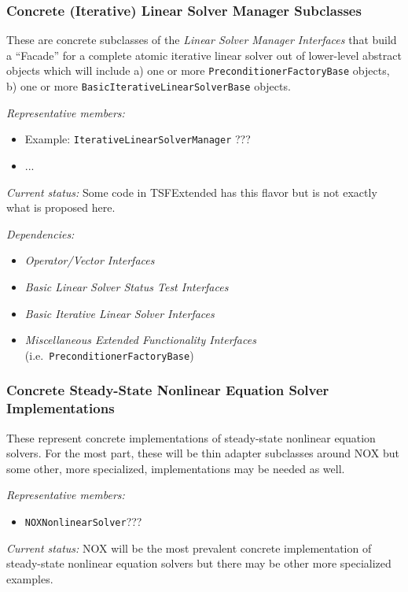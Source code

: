 \documentclass[pdf,ps2pdf,11pt]{SANDreport}
\begin{document}
%
\subsubsection{Concrete (Iterative) Linear Solver Manager Subclasses}
%

These are concrete subclasses of the {}\textit{Linear Solver Manager
Interfaces} that build a ``Facade'' for a complete atomic iterative linear
solver out of lower-level abstract objects which will include a) one or more
{}\texttt{Preconditioner\-Factory\-Base} objects, b) one or more
{}\texttt{Basic\-Iterative\-Linear\-Solver\-Base} objects.

{}\textit{Representative members:}
\begin{itemize}
%
{}\item Example: {}\texttt{IterativeLinearSolverManager} ??? 
%
{}\item ...
%
\end{itemize}

{}\textit{Current status:} Some code in TSFExtended has this flavor but is not
exactly what is proposed here.

{}\textit{Dependencies:}
\begin{itemize}
\item {}\textit{Operator/Vector Interfaces}
\item {}\textit{Basic Linear Solver Status Test Interfaces}
\item {}\textit{Basic Iterative Linear Solver Interfaces}
\item {}\textit{Miscellaneous Extended Functionality Interfaces}
(i.e.\ {}\texttt{Preconditioner\-Factory\-Base})
\end{itemize}

%
\subsubsection{Concrete Steady-State Nonlinear Equation Solver Implementations}
%

These represent concrete implementations of steady-state nonlinear equation
solvers.  For the most part, these will be thin adapter subclasses around NOX
but some other, more specialized, implementations may be needed as well.

{}\textit{Representative members:}
\begin{itemize}
%
{}\item {}\texttt{NOXNonlinearSolver}???
%
\end{itemize}

{}\textit{Current status:} NOX will be the most prevalent concrete
implementation of steady-state nonlinear equation solvers but there may be
other more specialized examples.
\end{document}
